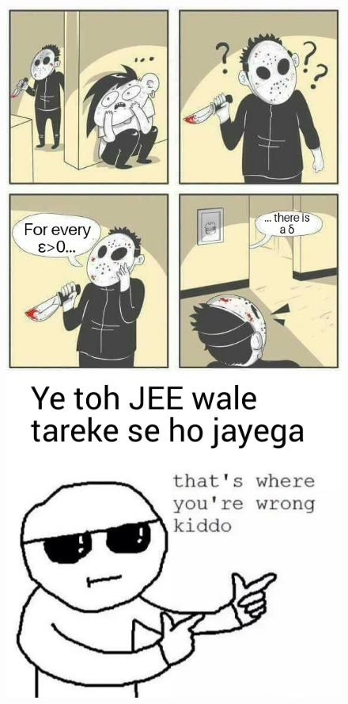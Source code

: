 \documentclass[handout, aspectratio=169]{beamer}
\begin{document}
\begin{frame} 
	\begin{figure}[t]
		\begin{minipage}{0.48\textwidth}
			\centering
			\includegraphics[width=7.5 cm]{30.jpg}
			
		\end{minipage}
		\begin{minipage}{0.48\textwidth}
			\centering
			\includegraphics[width=5 cm]{31.jpg}
			
		\end{minipage}
	\end{figure}
\end{frame}
\end{document}
